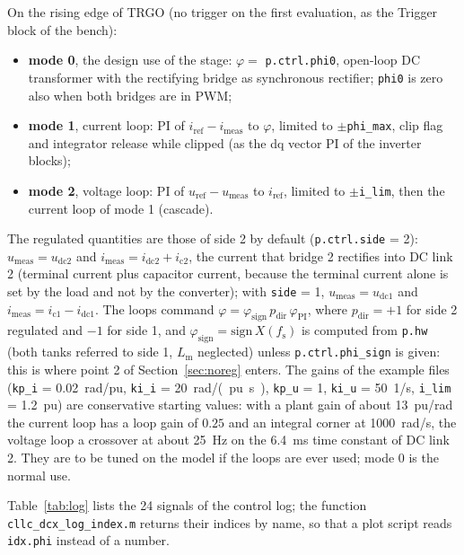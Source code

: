 \documentclass[12pt,a4paper]{scrartcl}
\newcommand{\ped}[1]{_{\mathrm{#1}}}
\newcommand{\code}[1]{\texttt{#1}}
\begin{document}
\begin{onehalfspace}
\noindent On the rising edge of TRGO (no trigger on the first evaluation, as the Trigger block of the bench):

\begin{itemize}[nosep]
	\item \textbf{mode 0}, the design use of the stage: $\varphi = $ \code{p.ctrl.phi0}, open-loop DC transformer with the rectifying bridge as synchronous rectifier; \code{phi0} is zero also when both bridges are in PWM;
	\item \textbf{mode 1}, current loop: PI of $i\ped{ref} - i\ped{meas}$ to $\varphi$, limited to $\pm$\code{phi\_max}, clip flag and integrator release while clipped (as the dq vector PI of the inverter blocks);
	\item \textbf{mode 2}, voltage loop: PI of $u\ped{ref} - u\ped{meas}$ to $i\ped{ref}$, limited to $\pm$\code{i\_lim}, then the current loop of mode 1 (cascade).
\end{itemize}

\noindent The regulated quantities are those of side 2 by default (\code{p.ctrl.side} = 2): $u\ped{meas} = u\ped{dc2}$ and $i\ped{meas} = i\ped{dc2} + i\ped{c2}$, the current that bridge 2 rectifies into DC link 2 (terminal current plus capacitor current, because the terminal current alone is set by the load and not by the converter); with \code{side} = 1, $u\ped{meas} = u\ped{dc1}$ and $i\ped{meas} = i\ped{c1} - i\ped{dc1}$. The loops command $\varphi = \varphi\ped{sign}\,p\ped{dir}\,\varphi\ped{PI}$, where $p\ped{dir} = +1$ for side 2 regulated and $-1$ for side 1, and $\varphi\ped{sign} = \mathrm{sign}\,X(f\ped{s})$ is computed from \code{p.hw} (both tanks referred to side 1, $L\ped{m}$ neglected) unless \code{p.ctrl.phi\_sign} is given: this is where point 2 of Section~\ref{sec:noreg} enters. The gains of the example files (\code{kp\_i} = \SI{0.02}{rad/pu}, \code{ki\_i} = \SI{20}{rad/(pu.s)}, \code{kp\_u} = 1, \code{ki\_u} = \SI{50}{1/s}, \code{i\_lim} = \SI{1.2}{pu}) are conservative starting values: with a plant gain of about \SI{13}{pu/rad} the current loop has a loop gain of $0.25$ and an integral corner at \SI{1000}{rad/s}, the voltage loop a crossover at about \SI{25}{\hertz} on the \SI{6.4}{\milli\second} time constant of DC link 2. They are to be tuned on the model if the loops are ever used; mode 0 is the normal use.

Table~\ref{tab:log} lists the 24 signals of the control log; the function \code{cllc\_dcx\_log\_index.m} returns their indices by name, so that a plot script reads \code{idx.phi} instead of a number.


\end{onehalfspace}
\end{document}
